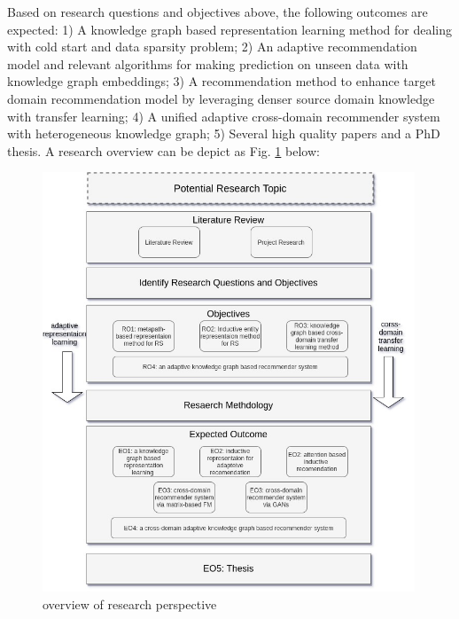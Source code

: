 Based on research questions and objectives above, the following outcomes are expected:
1) A knowledge graph based representation learning method for dealing with cold start and data sparsity problem;
2) An adaptive recommendation model and relevant algorithms for making prediction on unseen data with knowledge graph embeddings;
3) A recommendation method to enhance target domain recommendation model by leveraging denser source domain knowledge with transfer learning;
4) A unified adaptive cross-domain recommender system with heterogeneous knowledge graph;
5) Several high quality papers and a PhD thesis. A research overview can be depict as Fig. \ref{fig:r_overview} below: 
\begin{figure}[!h]
    \centering
    \includegraphics[width=0.99\textwidth]{figs/research_overview.jpg}
    \caption{overview of research perspective}\label{fig:r_overview}
\end{figure}
